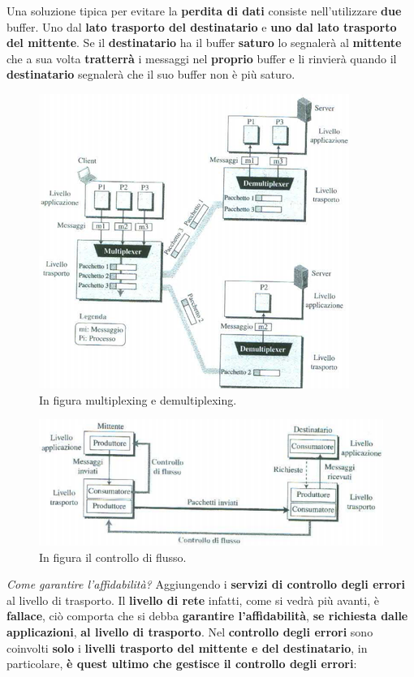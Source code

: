 \documentclass[11pt,a4paper]{article}
\theoremstyle{definition}
\begin{document}
\newpage
Una soluzione tipica per evitare la \textbf{perdita di dati} consiste nell'utilizzare \textbf{due} buffer. Uno dal \textbf{lato trasporto  del destinatario} e\textbf{ uno dal lato trasporto del mittente}. Se il \textbf{destinatario} ha il buffer \textbf{saturo} lo segnalerà al \textbf{mittente} che a sua volta \textbf{tratterrà} i messaggi nel \textbf{proprio} buffer e li rinvierà quando il \textbf{destinatario} segnalerà che il suo buffer non è più saturo.
\begin{figure}[!h]
	\includegraphics[scale=0.8]{Immagini/Plexing.png}
	\centering
	\caption{In figura multiplexing e demultiplexing.}
\end{figure}
\begin{figure}[!h]
	\includegraphics[scale=0.6]{Immagini/Flusso_ctr.png}
	\centering
	\caption{In figura il controllo di flusso.}
\end{figure}
\newpage
\textit{Come garantire l'affidabilità?}\newline\newline
Aggiungendo i \textbf{servizi di controllo degli errori} al livello di trasporto.
Il \textbf{livello di rete} infatti, come si vedrà più avanti, è \textbf{fallace}, ciò comporta che si debba \textbf{garantire l'affidabilità}, \textbf{se richiesta dalle applicazioni}, \textbf{al livello di trasporto}. Nel \textbf{controllo degli errori} sono coinvolti \textbf{solo} i \textbf{livelli trasporto del mittente e del destinatario}, in particolare, \textbf{è quest ultimo che gestisce il controllo degli errori}:
\end{document}

